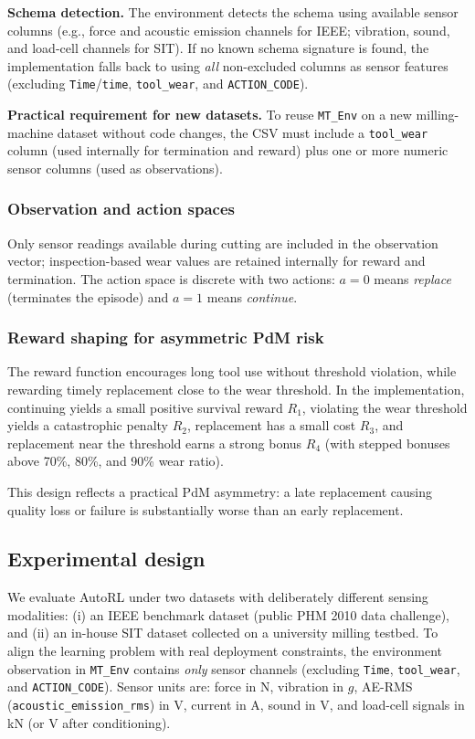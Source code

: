 \documentclass[sn-basic]{sn-jnl} %
\begin{document}
\textbf{Schema detection.}
The environment detects the schema using available sensor columns (e.g., force and acoustic emission channels for IEEE; vibration, sound, and load-cell channels for SIT). If no known schema signature is found, the implementation falls back to using \emph{all} non-excluded columns as sensor features (excluding \texttt{Time}/\texttt{time}, \texttt{tool\_wear}, and \texttt{ACTION\_CODE}).

\textbf{Practical requirement for new datasets.}
To reuse \texttt{MT\_Env} on a new milling-machine dataset without code changes, the CSV must include a \texttt{tool\_wear} column (used internally for termination and reward) plus one or more numeric sensor columns (used as observations).

\subsubsection{Observation and action spaces}
Only sensor readings available during cutting are included in the observation vector; inspection-based wear values are retained internally for reward and termination. The action space is discrete with two actions: $a=0$ means \emph{replace} (terminates the episode) and $a=1$ means \emph{continue}.

\subsubsection{Reward shaping for asymmetric PdM risk}
\label{sec:reward}
The reward function encourages long tool use without threshold violation, while rewarding timely replacement close to the wear threshold. In the implementation, continuing yields a small positive survival reward $R_1$, violating the wear threshold yields a catastrophic penalty $R_2$, replacement has a small cost $R_3$, and replacement near the threshold earns a strong bonus $R_4$ (with stepped bonuses above 70\%, 80\%, and 90\% wear ratio).

This design reflects a practical PdM asymmetry: a late replacement causing quality loss or failure is substantially worse than an early replacement.

\subsection{Experimental design} \label{sec:experiment} 

We evaluate AutoRL under two datasets with deliberately different sensing modalities: (i) an IEEE benchmark dataset (public PHM 2010 data challenge), and (ii) an in-house SIT dataset collected on a university milling testbed. To align the learning problem with real deployment constraints, the environment observation in \texttt{MT\_Env} contains \emph{only} sensor channels (excluding \texttt{Time}, \texttt{tool\_wear}, and \texttt{ACTION\_CODE}). Sensor units are: force in N, vibration in $g$, AE-RMS (\texttt{acoustic\_emission\_rms}) in V, current in A, sound in V, and load-cell signals in kN (or V after conditioning).
\end{document}
